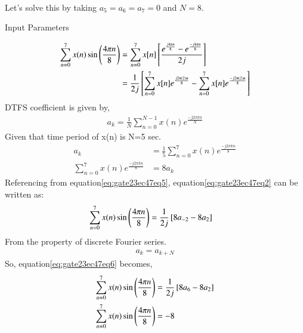 \documentclass[journal,12pt,onecolumn]{IEEEtran}
\theoremstyle{remark}
\begin{document}
\solution\\
Let's solve this by taking $a_5=a_6=a_7=0$ and $N=8$.
\begin{table}[h]
 	\centering
 	\resizebox{6 cm}{!}{
 		
 	}
 	\vspace{6 pt}
 	\caption{Input Parameters}
 	\label{eq:gate23ec47tab1}
 \end{table} 
\begin{align}
\sum\limits_{n=0}^{7}x(n) \sin\left(\frac{4\pi n}{8}\right)&=\sum\limits_{n=0}^{7}x[n]{}\left[\frac{e^{\frac{j4\pi n}{8}}-e^{\frac{-j4\pi n}{8}}}{2j}\right]\label{eq:gate23ec47eq1}\\
&=\frac{1}{2j}{}\left[\sum\limits_{n=0}^{7}x[n]e^{\frac{j2\pi (2)n}{8}}-\sum\limits_{n=0}^{7}x[n]e^{\frac{-j2\pi (2)n}{8}}\right]\label{eq:gate23ec47eq2}
\end{align}
DTFS coefficient is given by,\\
\begin{align}
a_k=\frac{1}{N}\sum\limits_{n=0}^{N-1} x(n)e^{\frac{-j2\pi kn}{N}}\label{eq:gate23ec47eq3}
\end{align}
Given that time period of x(n) is N=5 sec.\\
\begin{align}
a_k&=\frac{1}{5}\sum\limits_{n=0}^{7} x(n)e^{\frac{-j2\pi kn}{8}}\label{eq:gate23ec47eq4}\\
\sum\limits_{n=0}^{7} x(n)e^{\frac{-j2\pi kn}{8}}&=8a_k\label{eq:gate23ec47eq5}
\end{align}
Referencing from equation\eqref{eq:gate23ec47eq5}, equation\eqref{eq:gate23ec47eq2} can be written as:
\begin{align}
\sum\limits_{n=0}^{7}x(n) \sin\left(\frac{4\pi n}{8}\right)&=\frac{1}{2j}{}\left[8a_{-2}-8a_2\right]\label{eq:gate23ec47eq6}
\end{align}
From the property of discrete Fourier series.\\
\begin{align}
a_k=a_{k+N}\label{eq:gate23ec47eq7}
\end{align}
So, equation\eqref{eq:gate23ec47eq6} becomes,\\
\begin{align}
\sum\limits_{n=0}^{7}x(n) \sin\left(\frac{4\pi n}{8}\right)&=\frac{1}{2j}{}\left[8a_6-8a_2\right]\label{eq:gate23ec47eq8}\\
\sum\limits_{n=0}^{7}x(n) \sin\left(\frac{4\pi n}{8}\right)&=-8\label{eq:gate23ec47eq9}
\end{align}
\end{document}
